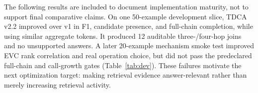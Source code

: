 The following results are included to document implementation maturity, not to support final comparative claims. On one 50-example development slice, TDCA v2.2 improved over v1 in F1, candidate presence, and full-chain completion, while using similar aggregate tokens. It produced 12 auditable three-/four-hop joins and no unsupported answers. A later 20-example mechanism smoke test improved EVC rank correlation and real operation choice, but did not pass the predeclared full-chain and call-growth gates (Table~\ref{tab:dev}). These failures motivate the next optimization target: making retrieval evidence answer-relevant rather than merely increasing retrieval activity.

\begin{table}[t]
\caption{Development-only diagnostics. Slices and versions are not directly comparable across blocks; no significance claim is made. Cand. is candidate presence and Chain is full-chain completion.}
\label{tab:dev}
\centering
{}
\end{table}
